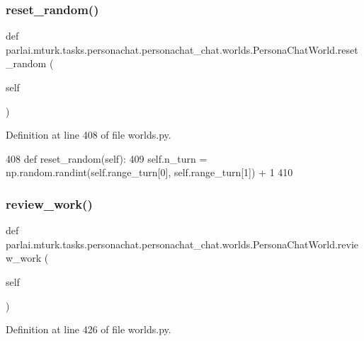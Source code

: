 \subsubsection{\texorpdfstring{reset\+\_\+random()}{reset\_random()}}
{\footnotesize\ttfamily def parlai.\+mturk.\+tasks.\+personachat.\+personachat\+\_\+chat.\+worlds.\+Persona\+Chat\+World.\+reset\+\_\+random (\begin{DoxyParamCaption}\item[{}]{self }\end{DoxyParamCaption})}



Definition at line 408 of file worlds.\+py.


\begin{DoxyCode}
408     \textcolor{keyword}{def }reset\_random(self):
409         self.n\_turn = np.random.randint(self.range\_turn[0], self.range\_turn[1]) + 1
410 
\end{DoxyCode}
\mbox{\label{classparlai_1_1mturk_1_1tasks_1_1personachat_1_1personachat__chat_1_1worlds_1_1PersonaChatWorld_a17e4312c4028bb75b1b1bc7f83557509}} 
\subsubsection{\texorpdfstring{review\+\_\+work()}{review\_work()}}
{\footnotesize\ttfamily def parlai.\+mturk.\+tasks.\+personachat.\+personachat\+\_\+chat.\+worlds.\+Persona\+Chat\+World.\+review\+\_\+work (\begin{DoxyParamCaption}\item[{}]{self }\end{DoxyParamCaption})}



Definition at line 426 of file worlds.\+py.



